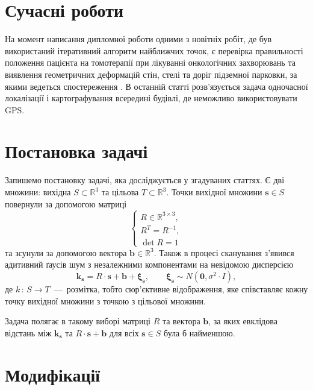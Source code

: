 \section{Сучасні роботи}

На момент написання дипломної роботи одними з новітніх робіт,
де був використаний ітеративний алгоритм найближчих точок,
є перевірка правильності положення пацієнта на томотерапії при лікуванні
онкологічних захворювань \cite{radiotherapy} та виявлення геометричних
деформацій стін, стелі та доріг підземної парковки,
за якими ведеться спостереження \cite{infractructure}.
В останній статті розв'язується задача одночасної локалізації і картографування
всередині будівлі, де неможливо використовувати GPS.

\section{Постановка задачі}

Запишемо постановку задачі, яка досліджується у згадуваних статтях.
Є дві множини:
вихідна $S \subset \mathbb{R}^3$ та цільова $T \subset \mathbb{R}^3$.
Точки вихідної множини $ \boldsymbol{s} \in S$ повернули за допомогою матриці
\begin{equation*}
  \begin{cases}
    R \in \mathbb{R}^{3 \times 3}, \\
    R^T = R^{-1}, \\
    \det{R} = 1
  \end{cases}
\end{equation*}
та зсунули за допомогою вектора $ \boldsymbol{b} \in \mathbb{R}^3$.
Також в процесі сканування
з'явився адитивний ґаусів шум з незалежними компонентами на невідомою дисперсією
\begin{equation}\label{eq:problem}
  \boldsymbol{k_s} = R \cdot \boldsymbol{s} + \boldsymbol{b} + \boldsymbol{ \xi_s}, \qquad
  \boldsymbol{ \xi_s } \sim N \left( \boldsymbol{0}, \sigma^2 \cdot I \right),
\end{equation}
де $k \, : \, S \to T$~---~розмітка, тобто сюр'єктивне відображення,
яке співставляє кожну точку вихідної множини з точкою з цільової множини.

Задача полягає в такому виборі матриці $R$ та вектора $ \boldsymbol{b}$,
за яких евклідова відстань між $ \boldsymbol{k_s}$ та $R \cdot \boldsymbol{s} + \boldsymbol{b}$ для
всіх $ \boldsymbol{s} \in S$ була б найменшою.

\section{Модифікації}


